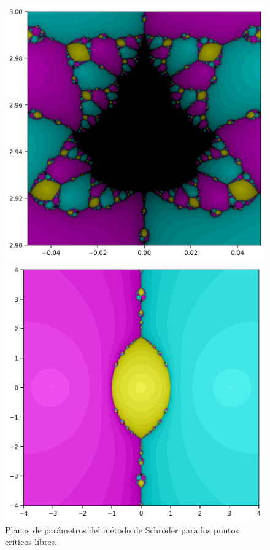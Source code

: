 \begin{figure}[H]
\centering 
\begin{minipage}[t]{0.48\textwidth}
\centering
\includegraphics[width=\textwidth]{img/plan_param_newton_2.png}
\end{minipage}\hfill
\begin{minipage}[t]{0.48\textwidth}
\centering
\includegraphics[width=\textwidth]{img/plan_param_newton_1.png}
\end{minipage}
\caption{Planos de parámetros del método de Schröder para los puntos críticos libres.}
\label{fig:planos_param_sch}
\end{figure}

